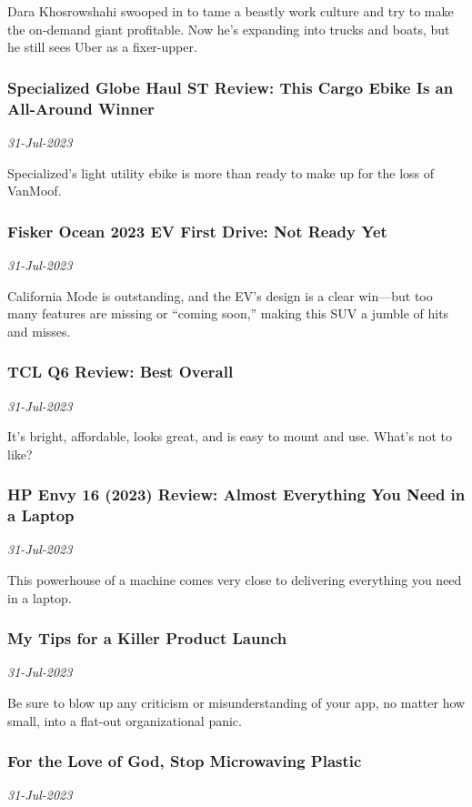 Dara Khosrowshahi swooped in to tame a beastly work culture and try to make the on-demand giant profitable. Now he’s expanding into trucks and boats, but he still sees Uber as a fixer-upper.
\subsubsection{Specialized Globe Haul ST Review: This Cargo Ebike Is an All-Around Winner \href{https://www.wired.com/review/specialized-globe-haul-st/}{}}
\textit{31-Jul-2023}

Specialized’s light utility ebike is more than ready to make up for the loss of VanMoof.
\subsubsection{Fisker Ocean 2023 EV First Drive: Not Ready Yet \href{https://www.wired.com/story/first-drive-fiskers-ocean-ev-is-just-not-ready-yet/}{}}
\textit{31-Jul-2023}

California Mode is outstanding, and the EV’s design is a clear win—but too many features are missing or “coming soon,” making this SUV a jumble of hits and misses.
\subsubsection{TCL Q6 Review: Best Overall \href{https://www.wired.com/review/tcl-q6-2023/}{}}
\textit{31-Jul-2023}

It’s bright, affordable, looks great, and is easy to mount and use. What’s not to like?
\subsubsection{HP Envy 16 (2023) Review: Almost Everything You Need in a Laptop \href{https://www.wired.com/review/hp-envy-16-2023/}{}}
\textit{31-Jul-2023}

This powerhouse of a machine comes very close to delivering everything you need in a laptop.
\subsubsection{My Tips for a Killer Product Launch \href{https://www.wired.com/story/my-tips-for-a-killer-product-launch/}{}}
\textit{31-Jul-2023}

Be sure to blow up any criticism or misunderstanding of your app, no matter how small, into a flat-out organizational panic.
\subsubsection{For the Love of God, Stop Microwaving Plastic \href{https://www.wired.com/story/for-the-love-of-god-stop-microwaving-plastic/}{}}
\textit{31-Jul-2023}

